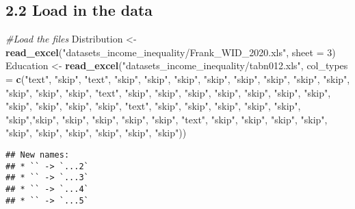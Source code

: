 \documentclass[
]{article}
\newenvironment{Shaded}{\begin{snugshade}}{\end{snugshade}}
\newcommand{\AttributeTok}[1]{\textcolor[rgb]{0.13,0.29,0.53}{#1}}
\newcommand{\CommentTok}[1]{\textcolor[rgb]{0.56,0.35,0.01}{\textit{#1}}}
\newcommand{\DecValTok}[1]{\textcolor[rgb]{0.00,0.00,0.81}{#1}}
\newcommand{\FunctionTok}[1]{\textcolor[rgb]{0.13,0.29,0.53}{\textbf{#1}}}
\newcommand{\NormalTok}[1]{#1}
\newcommand{\OtherTok}[1]{\textcolor[rgb]{0.56,0.35,0.01}{#1}}
\newcommand{\StringTok}[1]{\textcolor[rgb]{0.31,0.60,0.02}{#1}}
\begin{document}
\subsection{2.2 Load in the data}\label{load-in-the-data}

\begin{Shaded}
\begin{Highlighting}[]
\CommentTok{\#Load the files}
\NormalTok{Distribution }\OtherTok{\textless{}{-}} \FunctionTok{read\_excel}\NormalTok{(}\StringTok{"datasets\_income\_inequality/Frank\_WID\_2020.xls"}\NormalTok{, }\AttributeTok{sheet =} \DecValTok{3}\NormalTok{)}
\NormalTok{Education }\OtherTok{\textless{}{-}} \FunctionTok{read\_excel}\NormalTok{(}\StringTok{"datasets\_income\_inequality/tabn012.xls"}\NormalTok{, }\AttributeTok{col\_types =} \FunctionTok{c}\NormalTok{(}\StringTok{"text"}\NormalTok{, }\StringTok{"skip"}\NormalTok{, }\StringTok{"text"}\NormalTok{, }\StringTok{"skip"}\NormalTok{, }\StringTok{"skip"}\NormalTok{, }\StringTok{"skip"}\NormalTok{, }\StringTok{"skip"}\NormalTok{, }\StringTok{"skip"}\NormalTok{, }\StringTok{"skip"}\NormalTok{, }\StringTok{"skip"}\NormalTok{, }\StringTok{"skip"}\NormalTok{, }\StringTok{"skip"}\NormalTok{, }\StringTok{"skip"}\NormalTok{, }\StringTok{"skip"}\NormalTok{, }\StringTok{"text"}\NormalTok{, }\StringTok{"skip"}\NormalTok{, }\StringTok{"skip"}\NormalTok{, }\StringTok{"skip"}\NormalTok{, }\StringTok{"skip"}\NormalTok{, }\StringTok{"skip"}\NormalTok{, }\StringTok{"skip"}\NormalTok{, }\StringTok{"skip"}\NormalTok{, }\StringTok{"skip"}\NormalTok{, }\StringTok{"skip"}\NormalTok{, }\StringTok{"skip"}\NormalTok{, }\StringTok{"skip"}\NormalTok{, }\StringTok{"text"}\NormalTok{, }\StringTok{"skip"}\NormalTok{, }\StringTok{"skip"}\NormalTok{, }\StringTok{"skip"}\NormalTok{, }\StringTok{"skip"}\NormalTok{, }\StringTok{"skip"}\NormalTok{, }\StringTok{"skip"}\NormalTok{,}\StringTok{"skip"}\NormalTok{, }\StringTok{"skip"}\NormalTok{, }\StringTok{"skip"}\NormalTok{, }\StringTok{"skip"}\NormalTok{, }\StringTok{"skip"}\NormalTok{, }\StringTok{"text"}\NormalTok{, }\StringTok{"skip"}\NormalTok{, }\StringTok{"skip"}\NormalTok{, }\StringTok{"skip"}\NormalTok{, }\StringTok{"skip"}\NormalTok{, }\StringTok{"skip"}\NormalTok{, }\StringTok{"skip"}\NormalTok{, }\StringTok{"skip"}\NormalTok{, }\StringTok{"skip"}\NormalTok{, }\StringTok{"skip"}\NormalTok{, }\StringTok{"skip"}\NormalTok{))}
\end{Highlighting}
\end{Shaded}

\begin{verbatim}
## New names:
## * `` -> `...2`
## * `` -> `...3`
## * `` -> `...4`
## * `` -> `...5`
\end{verbatim}
\end{document}
